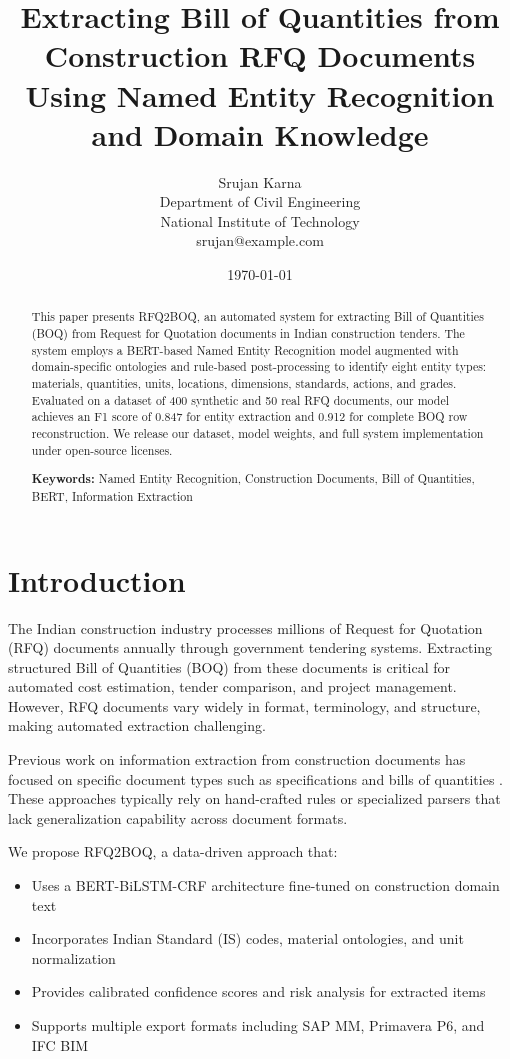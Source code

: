 \documentclass[pdftex,11pt]{article}
\title{Extracting Bill of Quantities from Construction RFQ Documents\\Using Named Entity Recognition and Domain Knowledge}
\author{
Srujan Karna \\[5pt]
Department of Civil Engineering \\[5pt]
National Institute of Technology \\[5pt]
srujan@example.com
}
\date{\today}
\begin{document}
\maketitle

\begin{abstract}
This paper presents RFQ2BOQ, an automated system for extracting Bill of Quantities (BOQ) from Request for Quotation documents in Indian construction tenders. The system employs a BERT-based Named Entity Recognition model augmented with domain-specific ontologies and rule-based post-processing to identify eight entity types: materials, quantities, units, locations, dimensions, standards, actions, and grades. Evaluated on a dataset of 400 synthetic and 50 real RFQ documents, our model achieves an F1 score of 0.847 for entity extraction and 0.912 for complete BOQ row reconstruction. We release our dataset, model weights, and full system implementation under open-source licenses.

\textbf{Keywords:} Named Entity Recognition, Construction Documents, Bill of Quantities, BERT, Information Extraction
\end{abstract}

\section{Introduction}

The Indian construction industry processes millions of Request for Quotation (RFQ) documents annually through government tendering systems. Extracting structured Bill of Quantities (BOQ) from these documents is critical for automated cost estimation, tender comparison, and project management. However, RFQ documents vary widely in format, terminology, and structure, making automated extraction challenging.

Previous work on information extraction from construction documents has focused on specific document types such as specifications \citep{survey2020} and bills of quantities \citep{bpq2018}. These approaches typically rely on hand-crafted rules or specialized parsers that lack generalization capability across document formats.

We propose RFQ2BOQ, a data-driven approach that:
\begin{itemize}
    \item Uses a BERT-BiLSTM-CRF architecture fine-tuned on construction domain text
    \item Incorporates Indian Standard (IS) codes, material ontologies, and unit normalization
    \item Provides calibrated confidence scores and risk analysis for extracted items
    \item Supports multiple export formats including SAP MM, Primavera P6, and IFC BIM
\end{itemize}
\end{document}
